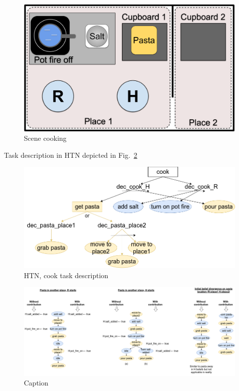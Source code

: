 \documentclass[letterpaper]{article} %
\begin{document}
\begin{figure}
    \centering
    \includegraphics[width=0.8\linewidth]{figures/scene.png}
    \caption{Scene cooking}
    \label{fig:scene}
\end{figure}

Task description in HTN depicted in Fig.~\ref{fig:htn}

\begin{figure}
    \centering
    \includegraphics[width=\linewidth]{figures/htn.png}
    \caption{HTN, cook task description}
    \label{fig:htn}
\end{figure}

\begin{figure}
    \centering
    \includegraphics[width=\linewidth]{figures/example_cook.png}
    \caption{Caption}
    \label{fig:scenarios}
\end{figure}
\end{document}
